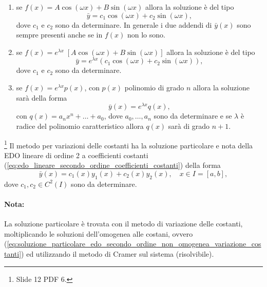 \begin{enumerate}
	\item se $f(x) = A \cos(\omega x) + B\sin(\omega x)$ allora la soluzione è del tipo
	\begin{equation*}
		\bar y = c_1 \cos(\omega x) + c_2 \sin(\omega x),
	\end{equation*}
	dove $c_1$ e $c_2$ sono da determinare. In generale i due addendi di $\bar y(x)$ sono sempre presenti anche se in $f(x)$ non lo sono.
	
	\item se $f(x) = e^{\lambda x}\;[A \cos(\omega x) + B\sin(\omega x)]$ allora la soluzione è del tipo
	\begin{equation*}
		\bar y = e^{\lambda x}(c_1 \cos(\omega x) + c_2 \sin(\omega x)),
	\end{equation*}
	dove $c_1$ e $c_2$ sono da determinare.
	
	\item se $f(x)=e^{\lambda x} p(x)$, con $p(x)$ polinomio di grado $n$ allora la soluzione sarà della forma
	\begin{equation*}
		\bar y(x) = e^{\lambda x} q(x),
	\end{equation*}
	con $q(x) = a_nx^n+\hdots + a_0$, dove $a_0,\hdots, a_n$ sono da determinare e se $\lambda$ è radice del polinomio caratteristico allora $q(x)$ sarà di grado $n+1$.
\end{enumerate}

\label{ssec:variazione_costanti}
\footnote{Slide 12 PDF 6.}
Il metodo per variazioni delle costanti ha la soluzione particolare e nota della EDO lineare di ordine 2 a coefficienti costanti (\ref{eq:edo_lineare_secondo_ordine_coefficienti_costanti}) della forma
\begin{equation}\label{eq:soluzione_particolare_edo_secondo_ordine_non_omogenea_variazione_costanti}
	\bar{y}(x) = c_1(x) y_1(x) + c_2(x) y_2(x),\quad x\in I=[a,b],
\end{equation}
dove $c_1,c_2\in C^2(I)$ sono da determinare.

\paragraph{Nota:} La soluzione particolare è trovata con il metodo di variazione delle costanti, moltiplicando le soluzioni dell'omogenea alle costani, ovvero (\ref{eq:soluzione_particolare_edo_secondo_ordine_non_omogenea_variazione_costanti}) ed utilizzando il metodo di Cramer sul sistema (risolvibile).

